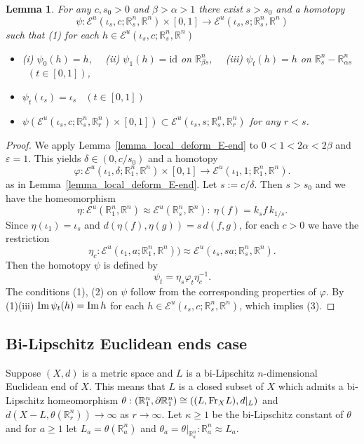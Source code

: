 \documentclass[11pt, fleqn]{amsart}
\newtheorem{lemma}{Lemma}[section]
\theoremstyle{definition}
\newcommand{\ds}{\displaystyle}
\renewcommand{\phi}{\varphi}
\newcommand{\lra}{\longrightarrow}
\newcommand{\e}{\varepsilon}
\newcommand{\id}{\mathrm{id}}
\newcommand{\E}{\mathcal E}
\newcommand{\IR}{\mathbb R}
\begin{document}
\begin{lemma}\label{lemma_deformation} 
For any $c, s_0 > 0$ and $\beta > \alpha > 1$ there exist $s > s_0$ and a homotopy 
$$\psi : \E^u(\iota_s, c; \IR^n_s, \IR^n) \times [0,1] \lra \E^u(\iota_s, s; \IR^n_s, \IR^n)$$ 
such that {\rm (1)} for each $h \in \E^u(\iota_s, c; \IR^n_s, \IR^n)$ 
\begin{itemize}
\item[] \hspace{8mm} {\rm (i)} $\psi_0(h) = h$, \ \ {\rm (ii)} $\psi_1(h) = \id$ on $\IR^n_{\beta s}$, \ \ 
{\rm (iii)} $\psi_t(h) = h$ on $\IR^n_s - \IR^n_{\alpha s}$ \ $(t \in [0,1])$,  

\item[(2)] $\psi_t(\iota_s) = \iota_s$ \ $(t \in [0,1])$
\item[(3)] $\psi(\E^u(\iota_s, c; \IR^n_s, \IR^n_r) \times [0,1]) \subset \E^u(\iota_s, s; \IR^n_s, \IR^n_r)$ for any $r < s$. 
\end{itemize} 
\end{lemma}

\begin{proof} 
We apply Lemma~\ref{lemma_local_deform_E-end} to $0 < 1 < 2 \alpha < 2\beta$ and $\e = 1$. This yields $\delta \in (0, c/s_0)$ and a homotopy 
$$\phi : \E^u(\iota_1, \delta; \IR^n_1, \IR^n) \times [0,1] \lra \E^u(\iota_1, 1; \IR^n_1, \IR^n).$$ 
as in Lemma~\ref{lemma_local_deform_E-end}.  
Let $s := c/\delta$. Then $s > s_0$ and we have the homeomorphism 
$$\eta : \E^u(\IR^n_1, \IR^n) \approx \E^u(\IR^n_s, \IR^n) : \ \eta(f) =  k_s f \, k_{1/s}.$$
Since $\eta(\iota_1) = \iota_s$ and $\ds d(\eta(f), \eta(g)) = s \,d(f, g)$, for each $c > 0$ we have the restriction  
$$\eta_c : \E^u(\iota_1, a; \IR^n_1, \IR^n)) \approx \E^u(\iota_s, sa; \IR^n_s, \IR^n).$$  
Then the homotopy $\psi$ is defined by 
$$\psi_t = \eta_s \phi_t\eta_c^{-1}.$$ 
The conditions (1), (2) on $\psi$ follow from the corresponding properties of $\phi$. 
By (1)(iii) ${\rm Im}\, \psi_t(h) = {\rm Im}\, h$ for each $h \in \E^u(\iota_s, c; \IR^n_s, \IR^n)$, which implies (3). 
\end{proof} 

\subsection{Bi-Lipschitz Euclidean ends case} \mbox{} 

Suppose $(X, d)$ is a metric space and $L$ is a bi-Lipschitz $n$-dimensional Euclidean end of $X$. 
This means that $L$ is a closed subset of $X$ which admits a bi-Lipschitz homeomorphism 
$\theta : (\IR^n_1, \partial \IR^n_1) \cong ((L, {\rm Fr}_X L), d|_L)$ and 
$d(X - L, \theta(\IR^n_r)) \to \infty$ as $r \to \infty$. 
Let $\kappa \geq 1$ be the bi-Lipschitz constant of $\theta$ and 
for $a \geq 1$ let $L_a = \theta(\IR^n_a)$ and $\theta_a = \theta|_{\IR^n_a} : \IR^n_a \approx L_a$. 
\end{document}
